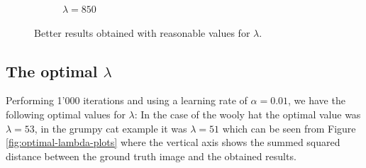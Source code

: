 \documentclass{paper}
\begin{document}
\begin{figure}[ht]
\begin{subfigure}[h]{0.3\textwidth}
    \caption*{$\lambda = 850$}
 \end{subfigure}
 \caption{Better results obtained with reasonable values for $\lambda$.}
 \label{fig:lambda-reasonable}
\end{figure}

\subsection*{The optimal $\lambda$}
Performing 1'000 iterations and using a learning rate of $\alpha = 0.01$, we have the following optimal values for $\lambda$: In the case of the wooly hat the optimal value was $\lambda = 53$, in the grumpy cat example it was $\lambda = 51$ which can be seen from Figure \ref{fig:optimal-lambda-plots} where the vertical axis shows the summed squared distance between the ground truth image and the obtained results.
\end{document}
